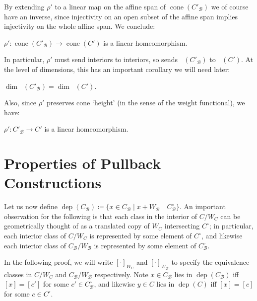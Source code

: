 \documentclass[12pt]{article}
\newcommand{\B}{\mathcal{B}}
\DeclareMathOperator{\dep}{dep}
\DeclareMathOperator{\cone}{cone^\circ}
\DeclareMathOperator{\ccone}{cone}
\theoremstyle{nonumberdefinition}
\theoremstyle{empty}
\theoremstyle{empty}
\begin{document}
By extending $\rho'$ to a linear map on the affine span of $\ccone(C'_\B)$ we of course have an inverse, since injectivity on an open subset of the affine span implies injectivity on the whole affine span. We conclude:

\begin{thm}
	$\rho' \colon \ccone(C'_\B) \to \ccone(C')$ is a linear homeomorphism.
\end{thm}

In particular, $\rho'$ must send interiors to interiors, so sends $\cone(C'_\B)$ to $\cone(C')$. At the level of dimensions, this has an important corollary we will need later:

\begin{corollary}
	$\dim \cone(C'_\B) = \dim \cone(C')$.
\end{corollary}

Also, since $\rho'$ preserves cone `height' (in the sense of the weight functional), we have:

\begin{corollary} \label{corr:C'IsomorphicToC'_B}
	$\rho' \colon C'_\B \to C'$ is a linear homeomorphism.
\end{corollary}


\section{Properties of Pullback Constructions}

Let us now define $\dep(C_\B) \coloneqq \{x \in C_\B \mid x + W_\B$ \,\, $C^\circ_\B\}$. An important observation for the following is that each class in the interior of $C / W_C$ can be geometrically thought of as a translated copy of $W_C$ intersecting $C^\circ$; in particular, each interior class of $C/W_C$ is represented by some element of $C^\circ$, and likewise each interior class of $C_\B / W_\B$ is represented by some element of $C^\circ_\B$.

In the following proof, we will write $[\cdot]_{W_C}$ and $[\cdot]_{W_\B}$ to specify the equivalence classes in $C/W_C$ and $C_\B / W_\B$ respectively. Note $x \in C_\B$ lies in $\dep(C_\B)$ iff $[x] = [c']$ for some $c' \in C_\B^\circ$, and likewise $y \in C$ lies in $\dep(C)$ iff $[x] = [c]$ for some $c \in C^\circ$.
\end{document}

